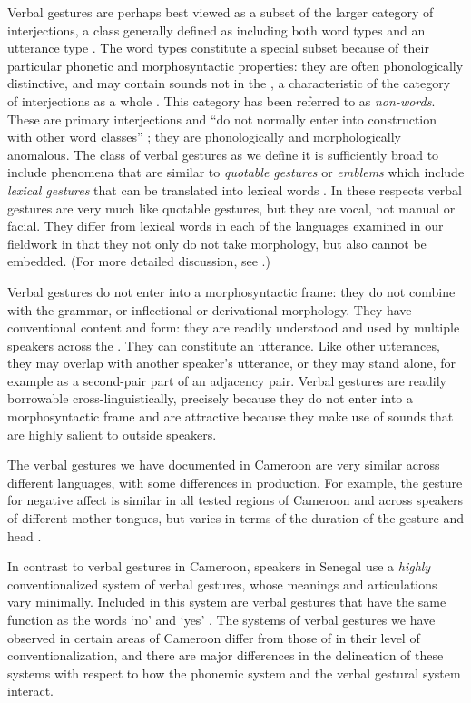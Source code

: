\documentclass[output=paper
,newtxmath
,modfonts
,nonflat]{langsci/langscibook}
\begin{document}
Verbal gestures are perhaps best viewed as a subset of the larger category of interjections, a class generally defined as including both word types and an utterance type \citep[102]{ameka1992}. The word types constitute a special subset because of their particular phonetic and morphosyntactic properties: they are often phonologically distinctive, and may contain sounds not in the ,  a characteristic of the category of interjections as a whole  \citep{schachter1985}. This category has been referred to as \textit{non-words}. These are primary interjections and ``do not normally enter into construction with other word classes''  \citep[105]{ameka1992}; they are phonologically and morphologically anomalous. The class of verbal gestures as we define it is sufficiently broad to include  phenomena that  are similar to \textit{quotable gestures} or \textit{emblems}  which  include\textit{ lexical gestures} that can be translated into lexical words \citep{brookes2004, poggi1983, poggizomparelli1987}. In these respects verbal gestures are very much like quotable gestures, but they are vocal, not manual or facial. They differ from lexical words in each of the languages examined in our fieldwork in that they not only do not take morphology, but also cannot be embedded. (For more detailed discussion, see \citealt{grenobleetal2015}.)  

Verbal gestures do not enter into a morphosyntactic frame: they do not combine with the grammar, or inflectional or derivational morphology. They have conventional content and form: they are  readily understood and used by multiple speakers across the . They  can constitute an utterance. Like other utterances, they may overlap with another speaker's utterance, or they may stand alone, for example as a second-pair part of an adjacency pair.
Verbal gestures are readily borrowable cross-linguistically, precisely because they do not enter into a morphosyntactic frame and are attractive because they make use of sounds that are highly salient to outside speakers. 

The verbal gestures we have documented in Cameroon are very similar across different languages, with some differences in production.  For example, the gesture for negative affect is similar in all tested regions of Cameroon and across speakers of different mother tongues, but varies in terms of the duration of the gesture and head .  

In contrast to verbal gestures in Cameroon,   speakers in Senegal use a \textit{highly} conventionalized system of verbal gestures, whose meanings and articulations vary minimally. Included in this system are verbal gestures that have the same function as the words `no' and `yes' \citep{grenobleetal2015}.  The systems of verbal gestures we have observed in certain areas of Cameroon differ from those of  in their level of conventionalization, and there are major differences in the delineation of these systems with respect to how the phonemic system and the verbal gestural system interact. 
\end{document}
